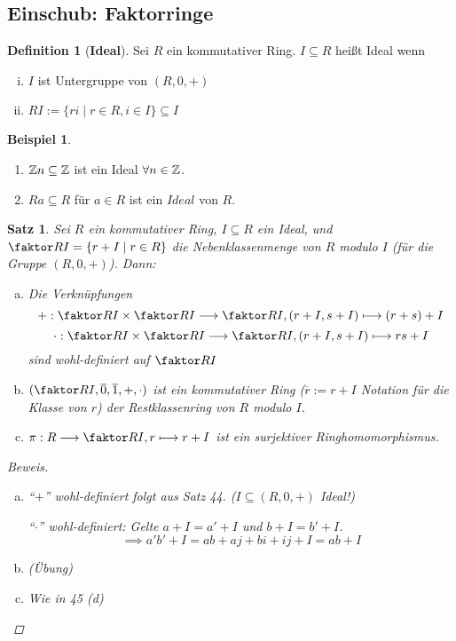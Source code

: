 \documentclass[a4paper]{report}
\theoremstyle{plain}
\newtheorem{satz}[thm]{Satz}
\theoremstyle{definition}
\newtheorem{defi}[thm]{Definition}
\newtheorem*{bsp*}{Beispiel}
\begin{document}
\subsection*{Einschub: Faktorringe}
\begin{defi}[\textbf{Ideal}]
  Sei $R$ ein kommutativer Ring. $I \subseteq R$ heißt Ideal wenn
  \begin{enumerate}[(i)]
    \item $I$ ist Untergruppe von $(R, 0, +)$
    \item $RI := \{ri \mid r \in R, i \in I\} \subseteq I$
  \end{enumerate}
\end{defi}
\begin{bsp*}
  \begin{enumerate}[1)]
    \item $\Bbb Zn \subseteq \Bbb Z$ ist ein Ideal $\forall n \in \Bbb Z$.
    \item $Ra \subseteq R$ für $a \in R$ ist ein $Ideal$ von $R$.
  \end{enumerate}
\end{bsp*}

\begin{satz}
  Sei $R$ ein kommutativer Ring, $I \subseteq R$ ein Ideal, und $\faktor RI = \{r + I \mid r \in R\}$ die Nebenklassenmenge von $R$ modulo $I$ (für die Gruppe $(R, 0, +)$). Dann:
  \begin{enumerate}[(a)]
    \item Die Verknüpfungen $$+ : \faktor RI \times \faktor RI \longrightarrow \faktor RI, (r+I, s+I) \longmapsto (r+s)+I$$
          $$\cdot : \faktor RI \times \faktor RI \longrightarrow \faktor RI, (r+I, s+I) \longmapsto rs+I$$
          sind wohl-definiert auf $\faktor RI$

    \item $(\faktor RI, \overline 0, \overline 1, +, \cdot)$ ist ein kommutativer Ring ($\overline r := r + I$ Notation für die Klasse von $r$) der Restklassenring von $R$ modulo $I$.
    \item $\pi : R \longrightarrow \faktor RI, r \longmapsto r+I$ ist ein surjektiver Ringhomomorphismus.
  \end{enumerate}
\begin{proof}[Beweis]
\begin{enumerate}[(a)]
  \item ``$+$'' wohl-definiert folgt aus Satz 44. ($I \subseteq (R, 0, +)$ Ideal!)

        ``$\cdot$''  wohl-definiert: Gelte $a+I = a'+I$ und $b+I = b'+I$.
        $$\implies a'b' + I = ab + aj + bi + ij + I = ab + I$$
  \item (Übung)
  \item Wie in 45 (d)
\end{enumerate}
\end{proof}
\end{satz}
\end{document}
